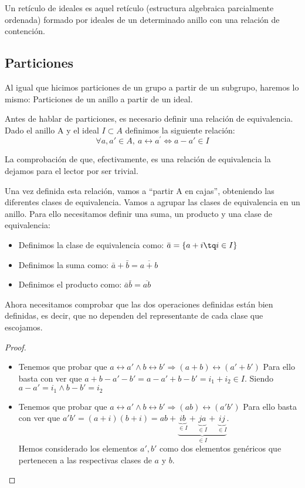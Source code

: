 \documentclass[nochap]{apuntes}
\begin{document}
\begin{defn}
Un retículo de ideales es aquel retículo (estructura algebraica parcialmente ordenada) formado por ideales de un determinado anillo
con una relación de contención.
\end{defn}

\subsection{Particiones}
Al igual que hicimos particiones de un grupo a partir de un subgrupo, haremos lo mismo: Particiones de un anillo a partir de un ideal.

Antes de hablar de particiones, es necesario definir una relación de equivalencia. Dado el anillo A y el ideal $I \subset A$ definimos la siguiente relación:
\[\forall a, a' \in A, \ a\rel a^{'} \Leftrightarrow a - a' \in I \]

La comprobación de que, efectivamente, es una relación de equivalencia la dejamos para el lector por ser trivial.

Una vez definida esta relación, vamos a ``partir A en cajas'', obteniendo las diferentes clases de equivalencia. Vamos a agrupar las clases de equivalencia en un anillo. Para ello necesitamos definir una suma, un producto y una clase de equivalencia:

\begin{itemize}
 \item Definimos la clase de equivalencia como: $\bar{a}=\{a+i \tq i \in I\}$
 \item Definimos la suma como: $\bar{a}+\bar{b}=\overline{a+b}$
 \item Definimos el producto como: $\bar{a}\bar{b}=\overline{ab}$
\end{itemize}
Ahora necesitamos comprobar que las dos operaciones definidas están bien definidas, es decir, que no dependen del representante de cada
clase que escojamos.
\begin{proof}
 \begin{itemize}
  \item Tenemos que probar que $a\rel a' \wedge b\rel b' \Rightarrow (a+b)\rel (a'+b')$
  Para ello basta con ver que $a+b-a'-b'=a-a'+b-b'=i_1+i_2 \in I$. Siendo $a-a'=i_1 \wedge b-b'=i_2$
  \item Tenemos que probar que $a\rel a' \wedge b\rel b' \Rightarrow (ab)\rel (a'b')$
  Para ello basta con ver que $a'b'=(a+i)(b+i)=ab+\underbrace{\underbrace{ib}_{\in I}+\underbrace{ja}_{\in I}+\underbrace{ij}_{\in I}}_{\in I}$.\\
  Hemos considerado los elementos $a', b'$  como dos elementos genéricos que pertenecen a las respectivas clases de $a$ y $b$.
 \end{itemize}
\end{proof}
\end{document}
